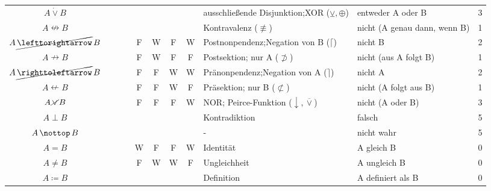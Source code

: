 \documentclass[english,ngerman,parskip=half,headsepline,footsepline]{scrreprt}
\newcommand{\texttrue}{W}
\newcommand{\textfalse}{F}
\newcommand{\lleft}{\operatorname{\righttoleftarrow}}  %
\newcommand{\lright}{\operatorname{\lefttorightarrow}} %
\newcommand{\lnequiv}{\operatorname{\nleftrightarrow}} %
\newcommand{\lxor}{\operatorname{\dot{\lor}}}          %
\newcommand{\lnright}{\operatorname{\cancel{\lright}}} %
\newcommand{\lnimp}{\operatorname{\nrightarrow}}       %
\newcommand{\lnleft}{\operatorname{\cancel{\lleft}}}   %
\newcommand{\lnleftimp}{\operatorname{\nleftarrow}}    %
\newcommand{\lnor}{\operatorname{\cancel{\lor}}}       %
\newcommand{\lbfalse}{\operatorname{\bot}}             %
\newcommand{\lnbtrue}{\operatorname{\nottop}    }      %
\newcommand{\defeq}{\coloneqq}
\begin{document}
\begin{table}
\begin{threeparttable}
\begin{tabularx}{\linewidth}{c||c:cc:cccc|X:X|c|}
				\tableline %
				$A\lxor B$&&&&\mrF&\mrW&\mrW&\mrF&ausschließende Disjunktion;\newline XOR ($\veebar, \oplus$)&entweder A oder B&3\\
				\gapline %
				$A\lnequiv B$&&&&&&&&Kontravalenz ($\not\equiv$)&{\small nicht (A genau dann, wenn B)}&1\\
				\tableline %
				$A\lnright B$&&&&\textfalse&\texttrue&\textfalse&\texttrue&Postnonpendenz;\newline Negation von B ($\lceil$)&nicht B&2\\
				\tableline %
				$A\lnimp B$&&&&\textfalse&\texttrue&\textfalse&\textfalse&Postsektion; nur A ($\not\supset$)&nicht (aus A folgt B)&1\\
				\tablegroup %
				$A\lnleft B$&&&&\textfalse&\textfalse&\texttrue&\texttrue&Pränonpendenz;\newline Negation von A ($\rceil$)&nicht A&2\\
				\tableline %
				$A\lnleftimp B$&&&&\textfalse&\textfalse&\texttrue&\textfalse&Präsektion; nur B ($\not\subset$)&nicht (A folgt aus B)&1\\
				\tableline %
				$A\lnor B$&&&&\textfalse&\textfalse&\textfalse&\texttrue&NOR; Peirce-Funktion ($\downarrow, \overline\vee$)&nicht (A oder B)&3\\
				\tableline %
				$A\lbfalse B$&&&&\mrF&\mrF&\mrF&\mrF&Kontradiktion&falsch&5\\
				\gapline %
				$A\lnbtrue B$&&&&&&&&-&nicht wahr&5\\
				\hline\hline %
				$A=B$&&&&\texttrue&\textfalse&\textfalse&\texttrue&Identität&A gleich B&0\\
				\tableline %
				$A\ne B$&&&&\textfalse&\texttrue&\texttrue&\textfalse&Ungleichheit&A ungleich B&0\\
				\tableline %
				$A\defeq B$&&&&&&&&Definition&A definiert als B&0\\

\end{tabularx}
\end{threeparttable}
\end{table}
\end{document}
